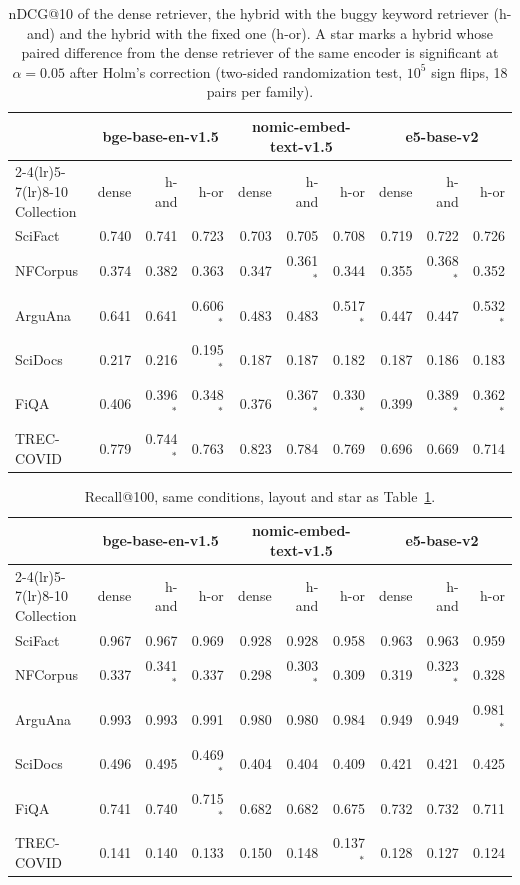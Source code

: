 \documentclass[11pt]{article}
\begin{document}
\begin{table}[h]
\centering
\small
\begin{tabular}{lrrrrrrrrr}
\toprule
 & \multicolumn{3}{c}{bge-base-en-v1.5} & \multicolumn{3}{c}{nomic-embed-text-v1.5} & \multicolumn{3}{c}{e5-base-v2} \\
\cmidrule(lr){2-4}\cmidrule(lr){5-7}\cmidrule(lr){8-10}
Collection & dense & h-and & h-or & dense & h-and & h-or & dense & h-and & h-or \\
\midrule
SciFact & 0.740 & 0.741 & 0.723 & 0.703 & 0.705 & 0.708 & 0.719 & 0.722 & 0.726 \\
NFCorpus & 0.374 & 0.382 & 0.363 & 0.347 & 0.361$^{*}$ & 0.344 & 0.355 & 0.368$^{*}$ & 0.352 \\
ArguAna & 0.641 & 0.641 & 0.606$^{*}$ & 0.483 & 0.483 & 0.517$^{*}$ & 0.447 & 0.447 & 0.532$^{*}$ \\
SciDocs & 0.217 & 0.216 & 0.195$^{*}$ & 0.187 & 0.187 & 0.182 & 0.187 & 0.186 & 0.183 \\
FiQA & 0.406 & 0.396$^{*}$ & 0.348$^{*}$ & 0.376 & 0.367$^{*}$ & 0.330$^{*}$ & 0.399 & 0.389$^{*}$ & 0.362$^{*}$ \\
TREC-COVID & 0.779 & 0.744$^{*}$ & 0.763 & 0.823 & 0.784 & 0.769 & 0.696 & 0.669 & 0.714 \\
\bottomrule
\end{tabular}
\caption{nDCG@10 of the dense retriever, the hybrid with the buggy keyword retriever (h-and) and the hybrid with the fixed one (h-or). A star marks a hybrid whose paired difference from the dense retriever of the same encoder is significant at $\alpha = 0.05$ after Holm's correction (two-sided randomization test, $10^5$ sign flips, 18 pairs per family).}
\label{tab:ndcg}
\end{table}

\begin{table}[h]
\centering
\small
\begin{tabular}{lrrrrrrrrr}
\toprule
 & \multicolumn{3}{c}{bge-base-en-v1.5} & \multicolumn{3}{c}{nomic-embed-text-v1.5} & \multicolumn{3}{c}{e5-base-v2} \\
\cmidrule(lr){2-4}\cmidrule(lr){5-7}\cmidrule(lr){8-10}
Collection & dense & h-and & h-or & dense & h-and & h-or & dense & h-and & h-or \\
\midrule
SciFact & 0.967 & 0.967 & 0.969 & 0.928 & 0.928 & 0.958 & 0.963 & 0.963 & 0.959 \\
NFCorpus & 0.337 & 0.341$^{*}$ & 0.337 & 0.298 & 0.303$^{*}$ & 0.309 & 0.319 & 0.323$^{*}$ & 0.328 \\
ArguAna & 0.993 & 0.993 & 0.991 & 0.980 & 0.980 & 0.984 & 0.949 & 0.949 & 0.981$^{*}$ \\
SciDocs & 0.496 & 0.495 & 0.469$^{*}$ & 0.404 & 0.404 & 0.409 & 0.421 & 0.421 & 0.425 \\
FiQA & 0.741 & 0.740 & 0.715$^{*}$ & 0.682 & 0.682 & 0.675 & 0.732 & 0.732 & 0.711 \\
TREC-COVID & 0.141 & 0.140 & 0.133 & 0.150 & 0.148 & 0.137$^{*}$ & 0.128 & 0.127 & 0.124 \\
\bottomrule
\end{tabular}
\caption{Recall@100, same conditions, layout and star as Table~\ref{tab:ndcg}.}
\label{tab:recall}
\end{table}
\end{document}
